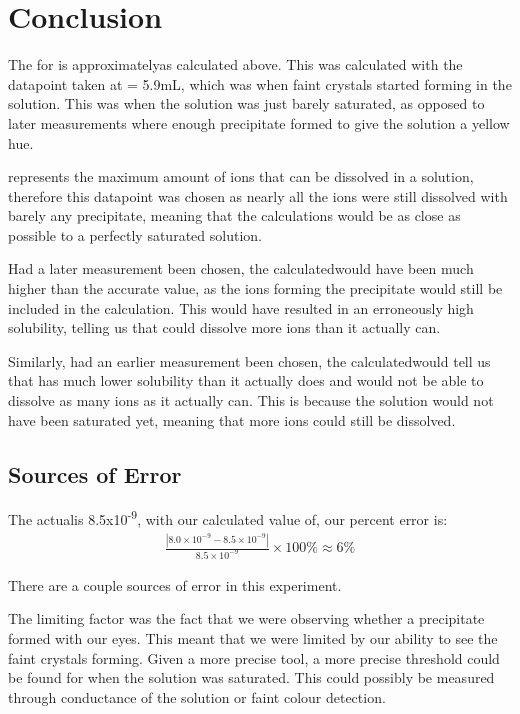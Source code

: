 
\section{Conclusion}

The \ksp for  is approximately\mksp as calculated above. This was calculated with the datapoint taken at \dv = 5.9mL, which was when faint crystals started forming in the solution. This was when the solution was just barely saturated, as opposed to later measurements where enough precipitate formed to give the solution a yellow hue.

\ksp represents the maximum amount of ions that can be dissolved in a solution, therefore this datapoint was chosen as nearly all the ions were still dissolved with barely any precipitate, meaning that the calculations would be as close as possible to a perfectly saturated solution.

Had a later measurement been chosen, the calculated\ksp would have been much higher than the accurate value, as the ions forming the precipitate would still be included in the calculation. This would have resulted in an erroneously high solubility, telling us that  could dissolve more ions than it actually can.

Similarly, had an earlier measurement been chosen, the calculated\ksp would tell us that  has much lower solubility than it actually does and would not be able to dissolve as many ions as it actually can. This is because the solution would not have been saturated yet, meaning that more ions could still be dissolved.


\subsection{Sources of Error}

The actual\ksp is 8.5x10\textsuperscript{-9}, with our calculated value of\mksp, our percent error is:
\begin{align*}
    \frac{|8.0 \times 10^{-9} - 8.5 \times 10^{-9}|}{8.5 \times 10^{-9}} \times 100 \% \approx 6\%
\end{align*}

There are a couple sources of error in this experiment.

The limiting factor was the fact that we were observing whether a precipitate formed with our eyes. This meant that we were limited by our ability to see the faint crystals forming. Given a more precise tool, a more precise threshold could be found for when the solution was saturated. This could possibly be measured through conductance of the solution or faint colour detection.

